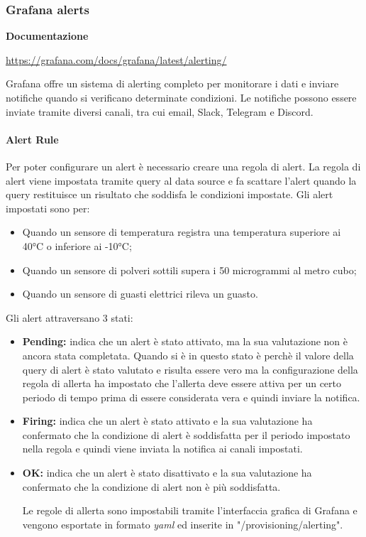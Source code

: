 \subsubsection{Grafana alerts}
\textbf{Documentazione}

\href{https://grafana.com/docs/grafana/latest/alerting/}{https://grafana.com/docs/grafana/latest/alerting/}


Grafana offre un sistema di alerting completo per monitorare i dati e inviare notifiche quando si verificano determinate condizioni. Le notifiche possono essere inviate tramite diversi canali, tra cui email, Slack, Telegram e Discord.

\paragraph{Alert Rule}
Per poter configurare un alert è necessario creare una regola di alert. La regola di alert viene impostata tramite query al data source e fa scattare l'alert quando la query restituisce un risultato che soddisfa le condizioni impostate.
Gli alert impostati sono per:
\begin{itemize}
    \item Quando un sensore di temperatura registra una temperatura superiore ai 40°C o inferiore ai -10°C;
    \item Quando un sensore di polveri sottili supera i 50 microgrammi al metro cubo;
    \item Quando un sensore di guasti elettrici rileva un guasto.
\end{itemize}

Gli alert attraversano 3 stati:
\begin{itemize}
    \item \textbf{Pending:} indica che un alert è stato attivato, ma la sua valutazione non è ancora stata completata.
                            Quando si è in questo stato è perchè il valore della query di alert è stato valutato e risulta essere vero ma la configurazione della regola di allerta ha impostato che l'allerta deve essere attiva per un certo periodo di tempo prima di essere considerata vera e quindi inviare la notifica.
\item \textbf{Firing:}  indica che un alert è stato attivato e la sua valutazione ha confermato che la condizione di alert è soddisfatta per il periodo impostato nella regola e quindi viene inviata la notifica ai canali impostati.
\item \textbf{OK:} indica che un alert è stato disattivato e la sua valutazione ha confermato che la condizione di alert non è più soddisfatta.

Le regole di allerta sono impostabili tramite l'interfaccia grafica di Grafana e vengono esportate in formato \textit{yaml} ed inserite in "/provisioning/alerting".
                            
\end{itemize}

